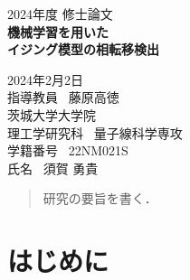 \documentclass[a4paper,11pt]{jsreport}
\begin{document}
\thispagestyle{empty}
\begin{center}

  \vspace{20mm}
  {\Large\noindent 2024年度 修士論文}\\
  \vspace{40mm}
  {\Huge\noindent\textbf{機械学習を用いた}}\\
  \medskip
  {\Huge\noindent\textbf{イジング模型の相転移検出}}\\
  \vspace{\baselineskip}
  \vspace{40mm}

  {\Large\noindent
    2024年2月2日\\
    \vspace{\baselineskip}
    指導教員 \ 藤原高徳    \\
    \vspace{\baselineskip}
    茨城大学大学院\\
    理工学研究科 \ 量子線科学専攻 \\
    \vspace{\baselineskip}
    学籍番号 \ 22NM021S \\
    氏名 \ 須賀 勇貴\\
  }
  \vspace{40mm}

\end{center}

\thispagestyle{empty}
\clearpage

\renewcommand{\abstractname}{要旨}

\begin{abstract}
  研究の要旨を書く．
\end{abstract}

\thispagestyle{empty}
\clearpage


\tableofcontents

\pagestyle{fancy}
\lhead{\rightmark}
\renewcommand{\chaptermark}[1]{\markboth{第\ \normalfont\thechapter\ 章~~#1}{}}
\chapter{はじめに} %
\end{document}
